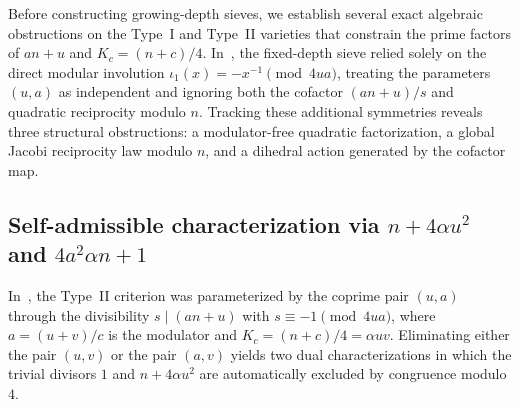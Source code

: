 \documentclass[11pt, a4paper]{article}
\theoremstyle{plain}
\theoremstyle{definition}
\begin{document}
Before constructing growing-depth sieves, we establish several exact algebraic obstructions on the Type~I and Type~II varieties that constrain the prime factors of $an+u$ and $K_c=(n+c)/4$. In~\cite{dahan2026a}, the fixed-depth sieve relied solely on the direct modular involution $\iota_1(x)=-x^{-1}\pmod{4ua}$, treating the parameters $(u,a)$ as independent and ignoring both the cofactor $(an+u)/s$ and quadratic reciprocity modulo $n$. Tracking these additional symmetries reveals three structural obstructions: a modulator-free quadratic factorization, a global Jacobi reciprocity law modulo $n$, and a dihedral action generated by the cofactor map.

\subsection{Self-admissible characterization via $n+4\alpha u^{2}$ and $4a^{2}\alpha n+1$}\label{subsec:quadratic_duality}

In~\cite[Thm.~3.9]{dahan2026a}, the Type~II criterion was parameterized by the coprime pair $(u,a)$ through the divisibility $s\mid(an+u)$ with $s\equiv-1\pmod{4ua}$, where $a=(u+v)/c$ is the modulator and $K_c=(n+c)/4=\alpha uv$. Eliminating either the pair $(u,v)$ or the pair $(a,v)$ yields two dual characterizations in which the trivial divisors $1$ and $n+4\alpha u^{2}$ are automatically excluded by congruence modulo $4$.
\end{document}
